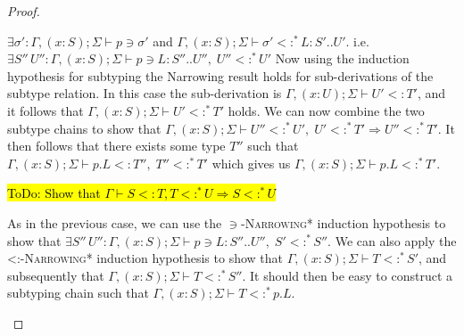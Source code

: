 \documentclass{llncs}
\numberwithin{subsubcase}{subcase}
\numberwithin{subcase}{casethm}
\numberwithin{casethm}{theorem}
\numberwithin{casethm}{lemma}
\begin{document}
\begin{proof}
\begin{casethm}
$\exists \sigma':
\Gamma, (x : S); \Sigma \vdash p \ni \sigma'$ and
$\Gamma, (x : S); \Sigma \vdash \sigma' <:^* L : S' .. U'$.
i.e. $\exists S'' \, U'' : \Gamma, (x : S); \Sigma \vdash p \ni L : S'' .. U'', \;
U'' <:^* U'$
Now using the induction hypothesis for subtyping the Narrowing result holds for 
sub-derivations of the subtype relation. In this case the sub-derivation is 
$\Gamma, (x : U); \Sigma \vdash U' <: T'$, and it follows that 
$\Gamma, (x : S); \Sigma \vdash U' <:^* T'$ holds. 
We can now combine the two subtype chains to show that 
$\Gamma, (x : S); \Sigma \vdash U'' <:^* U', \; U' <:^* T' \Rightarrow  U'' <:^* T'$. 
It then follows that there exists some type $T''$ such that 
$\Gamma, (x : S); \Sigma \vdash p.L <: T'', \; T'' <:^* T'$ 
which gives us $\Gamma, (x : S); \Sigma \vdash p.L <:^* T'$.

\hl{ToDo: Show that $\Gamma \vdash S <: T, T <:^* U \Rightarrow S <:^* U$}
\end{casethm}
\begin{casethm}
As in the previous case, we can use the \textsc {$\ni$-Narrowing*}
induction hypothesis to show that 
$\exists S'' \, U'' : \Gamma, (x : S); \Sigma \vdash p \ni L : S'' .. U'', \;
S' <:^* S''$.
We can also apply the \textsc {<:-Narrowing*} induction hypothesis 
to show that $\Gamma, (x : S); \Sigma \vdash T <:^* S'$, 
and subsequently that 
$\Gamma, (x : S); \Sigma \vdash T <:^* S''$. It  should then be easy 
to construct a subtyping chain such that 
$\Gamma, (x : S); \Sigma \vdash T <:^* p.L$.


\end{casethm}
\end{proof}
\end{document}
